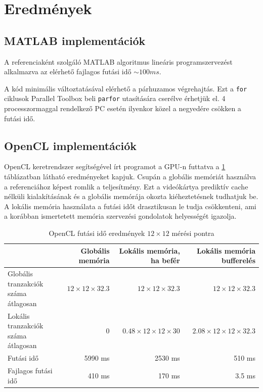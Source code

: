  \section{Eredmények} 
	\subsection{MATLAB implementációk}
	A referenciaként szolgáló MATLAB algoritmus lineáris programszervezést
	alkalmazva az elérhető fajlagos futási idő $\sim100 ms$.
	
	A kód minimális változtatásával elérhető a párhuzamos végrehajtás. Ezt a
	\texttt{for} ciklusok Parallel Toolbox beli \texttt{parfor} utasítására
	cserélve érhetjük el. 4 processzormaggal rendelkező PC esetén ilyenkor
	közel a negyedére csökken a futási idő.
	
	\subsection{OpenCL implementációk}
	OpenCL keretrendszer segítségével írt programot a GPU-n futtatva a
	\ref{table:openresult} táblázatban látható eredményeket kapjuk.
	Csupán a globális memóriát használva a referenciához képest romlik a
	teljesítmény. Ezt a videókártya prediktív cache nélküli kialakításának és a
	globális memórája okozta kiéheztetésnek tudhatjuk be.
	A lokális memória használata a futási időt drasztikusan le tudja
	csökkenteni, ami a korábban ismertetett memória szervezési gondolatok
	helyességét igazolja.
	 
	\begin{table}[!b]
	\renewcommand{\arraystretch}{1.2}
	\caption{OpenCL futási idő eredmények $12\times12$ mérési pontra}
	\label{table:openresult}
	\centering
	\begin{tabular}{l|r|r|r}
	 & Globális memória & Lokális memória, ha befér & Lokális memória bufferelés\\ \hline
	\parbox{2.5cm}{Globális tranzakciók száma átlagosan} & $12 \times 12\times 32.3$
	& $12 \times 12 \times 32.3$ & $12 \times 12 \times 32.3$\\
	\parbox{2.5cm}{Lokális tranzakciók száma átlagosan} & 0 &
	$0.48 \times 12 \times 12 \times 30$ & $2.08 \times 12 \times12 \times 32.3$\\
	Futási idő & 5990 ms & 2530 ms & 510 ms\\
	Fajlagos futási idő & 410 ms & 170 ms & 3.5 ms 
	\end{tabular}
	\end{table}
	
